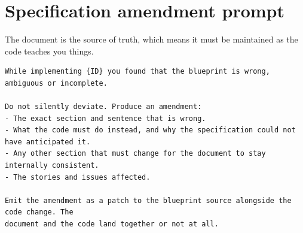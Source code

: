\section{Specification amendment prompt}

The document is the source of truth, which means it must be maintained as the code teaches
you things.

\begin{lstlisting}
While implementing {ID} you found that the blueprint is wrong, ambiguous or incomplete.

Do not silently deviate. Produce an amendment:
- The exact section and sentence that is wrong.
- What the code must do instead, and why the specification could not have anticipated it.
- Any other section that must change for the document to stay internally consistent.
- The stories and issues affected.

Emit the amendment as a patch to the blueprint source alongside the code change. The
document and the code land together or not at all.
\end{lstlisting}
